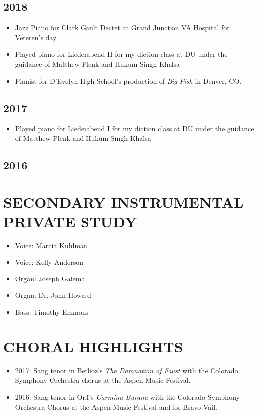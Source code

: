 \documentclass{article}
\newcommand{\cvItem}[1]{
        \item {
            {#1}
        }
    }
\newcommand{\cvItemListStart}{\begin{itemize}[leftmargin=10pt]}
\newcommand{\cvItemListEnd}{\end{itemize}}
\begin{document}
        \subsection{2018}
            \cvItemListStart
                \cvItem{Jazz Piano for Clark Gault Dectet at Grand Junction VA Hospital for
                Veteren's day}
                \cvItem{Played piano for Liederabend II for my diction class at DU under the guidance
                of Matthew Plenk and Hukum Singh Khalsa}
                \cvItem{Pianist for D'Evelyn High School's production of {\em Big Fish} in Denver, CO.}
            \cvItemListEnd
        \subsection{2017}
            \cvItemListStart
                \cvItem{Played piano for Liederabend I for my diction class at DU under the guidance
                of Matthew Plenk and Hukum Singh Khalsa}
            \cvItemListEnd
        \subsection{2016}

    \section{SECONDARY INSTRUMENTAL PRIVATE STUDY}
        \cvItemListStart
            \cvItem{Voice: Marcia Kuhlman}
            \cvItem{Voice: Kelly Anderson}
            \cvItem{Organ: Joseph Galema}
            \cvItem{Organ: Dr. John Howard}
            \cvItem{Bass: Timothy Emmons}
        \cvItemListEnd
    \section{CHORAL HIGHLIGHTS}
       \cvItemListStart
           \cvItem{2017: Sang tenor in Berlioz's {\em The Damnation of Faust} with the Colorado
           Symphony Orchestra chorus at the Aspen Music Festival.}
           \cvItem{2016: Sang tenor in Orff's {\em Carmina Burana} with the Colorado Symphony
           Orchestra Chorus at the Aspen Music Festival and for Bravo Vail.}
        \cvItemListEnd
\end{document}
